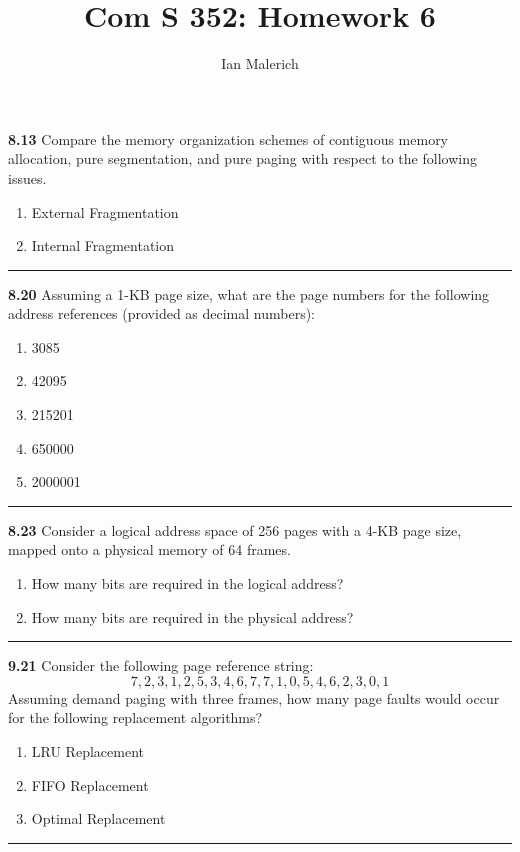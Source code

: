 \documentclass[12pt]{jhwhw}
\author{Ian Malerich}
\title{Com S 352: Homework 6}
\begin{document}
\raggedright

\textbf{8.13}  
	Compare the memory organization schemes of contiguous memory allocation, 
	pure segmentation, and pure paging with respect to the following issues.
	\begin{enumerate}
		\item External Fragmentation
		\item Internal Fragmentation
	\end{enumerate}
\textcolor[RGB]{240,240,240}{\rule{\textwidth}{0.5pt}}\bigbreak

	\begin{addmargin}[1em]{}
	\end{addmargin}

\textbf{8.20}  
	Assuming a 1-KB page size, what are the page numbers for the following address
	references (provided as decimal numbers):
	\begin{enumerate}
		\item 3085
		\item 42095
		\item 215201
		\item 650000
		\item 2000001
	\end{enumerate}
\textcolor[RGB]{240,240,240}{\rule{\textwidth}{0.5pt}}\bigbreak

	\begin{addmargin}[1em]{}
	\end{addmargin}

\textbf{8.23}  
	Consider a logical address space of 256 pages with a 4-KB page size, mapped onto a physical
	memory of 64 frames.
	\begin{enumerate}
		\item How many bits are required in the logical address?
		\item How many bits are required in the physical address?
	\end{enumerate}
\textcolor[RGB]{240,240,240}{\rule{\textwidth}{0.5pt}}\bigbreak

	\begin{addmargin}[1em]{}
	\end{addmargin}

\textbf{9.21}  
	Consider the following page reference string: \\
	$$ 7,2,3,1,2,5,3,4,6,7,7,1,0,5,4,6,2,3,0,1 $$
	Assuming demand paging with three frames, how many page faults would occur for the following
	replacement algorithms?
	\begin{enumerate}
		\item LRU Replacement
		\item FIFO Replacement
		\item Optimal Replacement
	\end{enumerate}
\textcolor[RGB]{240,240,240}{\rule{\textwidth}{0.5pt}}\bigbreak
\end{document}
